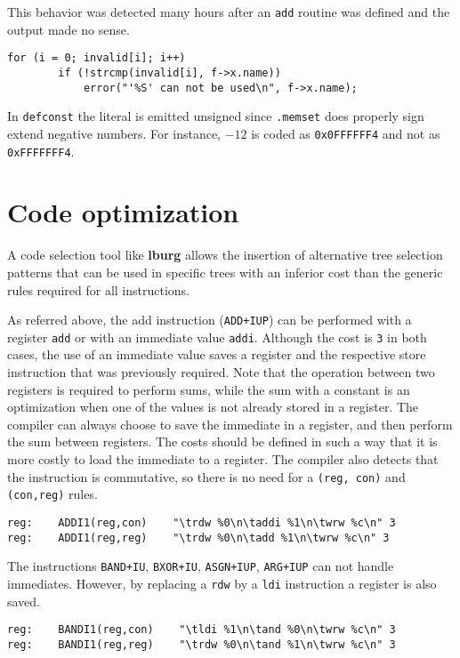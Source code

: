 This behavior was detected many hours after an
{\tt add} routine was defined and the output made
no sense.
\begin{Verbatim}[baselinestretch=1.2]
    for (i = 0; invalid[i]; i++)
        if (!strcmp(invalid[i], f->x.name))
            error("'%S' can not be used\n", f->x.name);
\end{Verbatim}

In {\tt defconst} the literal is emitted unsigned since
{\tt .memset} does properly sign extend negative numbers.
For instance, $-12$ is coded as {\tt 0x0FFFFFF4} and not
as {\tt 0xFFFFFFF4}.

\section{Code optimization}

A code selection tool like {\bf lburg} allows the insertion of
alternative tree selection patterns that can be used in specific
trees with an inferior cost than the generic rules required
for all instructions.

As referred above, the add instruction ({\tt ADD+IUP}) can be
performed with a register {\tt add} or with an immediate
value {\tt addi}.
Although the cost is {\tt 3} in both cases, the use of an immediate
value saves a register and the respective store instruction that
was previously required.
Note that the operation between two registers is required to perform
sums, while the sum with a constant is an optimization when one
of the values is not already stored in a register.
The compiler can always choose to save the immediate in a register,
and then perform the sum between registers.
The costs should be defined in such a way that it is more costly
to load the immediate to a register.
The compiler also detects that the instruction is commutative,
so there is no need for a {\tt (reg, con)} and {\tt (con,reg)} rules.
\begin{Verbatim}[baselinestretch=1.2]
reg:    ADDI1(reg,con)    "\trdw %0\n\taddi %1\n\twrw %c\n" 3
reg:    ADDI1(reg,reg)    "\trdw %0\n\tadd %1\n\twrw %c\n" 3
\end{Verbatim}

The instructions {\tt BAND+IU}, {\tt BXOR+IU}, {\tt ASGN+IUP},
{\tt ARG+IUP} can not handle immediates.
However, by replacing a {\tt rdw} by a {\tt ldi} instruction
a register is also saved.
\begin{Verbatim}[baselinestretch=1.2]
reg:    BANDI1(reg,con)    "\tldi %1\n\tand %0\n\twrw %c\n" 3
reg:    BANDI1(reg,reg)    "\trdw %0\n\tand %1\n\twrw %c\n" 3
\end{Verbatim}

